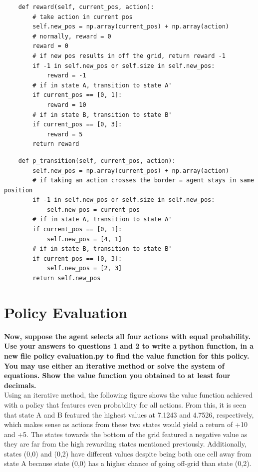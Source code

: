 \documentclass[11pt]{article}
\begin{document}
\lstset{basicstyle=\footnotesize}
\begin{lstlisting}
    def reward(self, current_pos, action):
        # take action in current pos
        self.new_pos = np.array(current_pos) + np.array(action)
        # normally, reward = 0
        reward = 0
        # if new pos results in off the grid, return reward -1
        if -1 in self.new_pos or self.size in self.new_pos:
            reward = -1
        # if in state A, transition to state A'
        if current_pos == [0, 1]:
            reward = 10
        # if in state B, transition to state B'
        if current_pos == [0, 3]:
            reward = 5
        return reward
\end{lstlisting}

\lstset{basicstyle=\footnotesize}
\begin{lstlisting}
    def p_transition(self, current_pos, action):
        self.new_pos = np.array(current_pos) + np.array(action)
        # if taking an action crosses the border = agent stays in same position
        if -1 in self.new_pos or self.size in self.new_pos: 
            self.new_pos = current_pos
        # if in state A, transition to state A'
        if current_pos == [0, 1]:
            self.new_pos = [4, 1]
        # if in state B, transition to state B'
        if current_pos == [0, 3]:
            self.new_pos = [2, 3]
        return self.new_pos
\end{lstlisting}


\newpage
\section{Policy Evaluation}
\textbf{Now, suppose the agent selects all four actions with equal probability. Use your
answers to questions 1 and 2 to write a python function, in a new file policy
evaluation.py to find the value function for this policy. You may use either an
iterative method or solve the system of equations. Show the value function you
obtained to at least four decimals.}
\\

\noindent
Using an iterative method, the following figure shows the value function
achieved with a policy that features even probability for all actions. From
this, it is seen that state A and B featured the highest values at 7.1243 and
4.7526, respectively, which makes sense as actions from these two states would
yield a return of +10 and +5. The states towards the bottom of the grid featured
a negative value as they are far from the high rewarding states mentioned
previously. Additionally, states (0,0) and (0,2) have different values despite
being both one cell away from state A because state (0,0) has a higher chance of
going off-grid than state (0,2).
\end{document}
